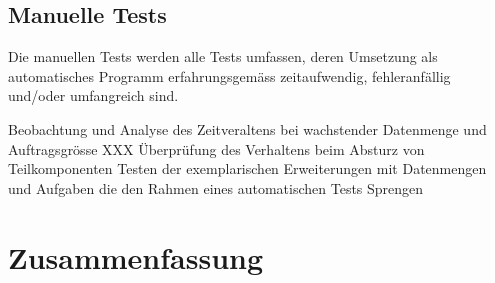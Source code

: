\subsection{Manuelle Tests}

Die manuellen Tests werden alle Tests umfassen,
deren Umsetzung als automatisches Programm erfahrungsgem\"ass zeitaufwendig,
fehleranf\"allig und/oder umfangreich sind.


\begin{description}
  \dhitem[Zeitverhalten]
    Beobachtung und Analyse des Zeitveraltens bei wachstender Datenmenge und Auftragsgr\"osse
  \dhitem[Raceverhalten]
    XXX
    \"Uberpr\"ufung des Verhaltens beim Absturz von Teilkomponenten
    Testen der exemplarischen Erweiterungen mit Datenmengen und Aufgaben
    die den Rahmen eines automatischen Tests Sprengen
\end{description}

\section{Zusammenfassung}

